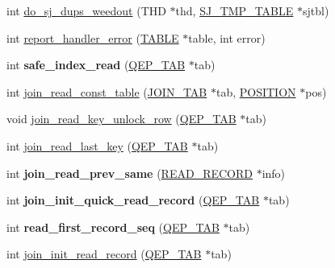 \begin{DoxyCompactItemize}
\item 
int \mbox{\hyperlink{group__Query__Executor_ga4c3b77b483fa5b7bcefe0f38587480c8}{do\+\_\+sj\+\_\+dups\+\_\+weedout}} (T\+HD $\ast$thd, \mbox{\hyperlink{classSJ__TMP__TABLE}{S\+J\+\_\+\+T\+M\+P\+\_\+\+T\+A\+B\+LE}} $\ast$sjtbl)
\item 
int \mbox{\hyperlink{group__Query__Executor_ga4fb800e0e68d03a1b49a9cf66fda4006}{report\+\_\+handler\+\_\+error}} (\mbox{\hyperlink{structTABLE}{T\+A\+B\+LE}} $\ast$table, int error)
\item 
\mbox{\label{group__Query__Executor_ga6634e09c549559c5547496bf849a6c0d}} 
int {\bfseries safe\+\_\+index\+\_\+read} (\mbox{\hyperlink{classQEP__TAB}{Q\+E\+P\+\_\+\+T\+AB}} $\ast$tab)
\item 
int \mbox{\hyperlink{group__Query__Executor_ga39c30d89f411ee0d12ecd4824f9aae1a}{join\+\_\+read\+\_\+const\+\_\+table}} (\mbox{\hyperlink{classJOIN__TAB}{J\+O\+I\+N\+\_\+\+T\+AB}} $\ast$tab, \mbox{\hyperlink{structst__position}{P\+O\+S\+I\+T\+I\+ON}} $\ast$pos)
\item 
void \mbox{\hyperlink{group__Query__Executor_ga2e0154a16c989becf374e885b851aaab}{join\+\_\+read\+\_\+key\+\_\+unlock\+\_\+row}} (\mbox{\hyperlink{classQEP__TAB}{Q\+E\+P\+\_\+\+T\+AB}} $\ast$tab)
\item 
int \mbox{\hyperlink{group__Query__Executor_ga9cf45a16cbecb892a847bb2ac6e92a56}{join\+\_\+read\+\_\+last\+\_\+key}} (\mbox{\hyperlink{classQEP__TAB}{Q\+E\+P\+\_\+\+T\+AB}} $\ast$tab)
\item 
\mbox{\label{group__Query__Executor_ga4478c7766644e31523194a220460a9f2}} 
int {\bfseries join\+\_\+read\+\_\+prev\+\_\+same} (\mbox{\hyperlink{structREAD__RECORD}{R\+E\+A\+D\+\_\+\+R\+E\+C\+O\+RD}} $\ast$info)
\item 
\mbox{\label{group__Query__Executor_ga0d5bd1e4067c849c724d3d711584fb58}} 
int {\bfseries join\+\_\+init\+\_\+quick\+\_\+read\+\_\+record} (\mbox{\hyperlink{classQEP__TAB}{Q\+E\+P\+\_\+\+T\+AB}} $\ast$tab)
\item 
\mbox{\label{group__Query__Executor_ga790d98d6f46425c61c7265b7cdf16778}} 
int {\bfseries read\+\_\+first\+\_\+record\+\_\+seq} (\mbox{\hyperlink{classQEP__TAB}{Q\+E\+P\+\_\+\+T\+AB}} $\ast$tab)
\item 
int \mbox{\hyperlink{group__Query__Executor_gad4a1cc488b1586d28aa8cfd90bb875df}{join\+\_\+init\+\_\+read\+\_\+record}} (\mbox{\hyperlink{classQEP__TAB}{Q\+E\+P\+\_\+\+T\+AB}} $\ast$tab)

\end{DoxyCompactItemize}
